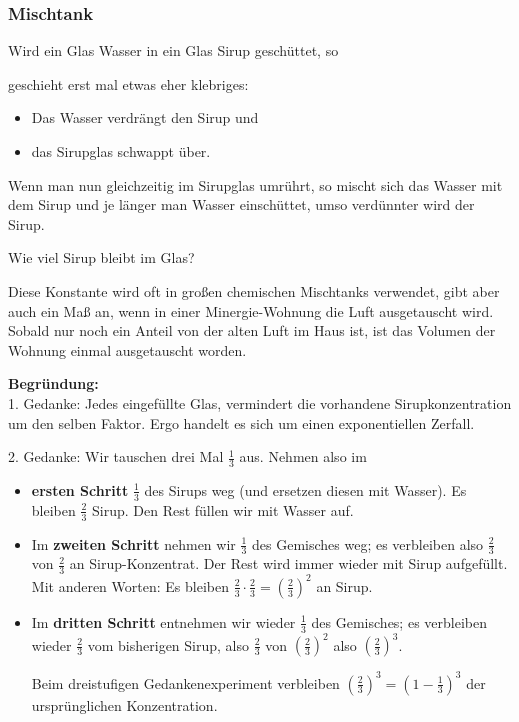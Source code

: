 \subsubsection{Mischtank}\label{sirup_beispiel}
Wird ein Glas Wasser in ein Glas Sirup geschüttet, so


geschieht erst mal etwas eher klebriges:
\begin{itemize}
  \item Das Wasser verdrängt den Sirup und
  \item das Sirupglas schwappt über.
\end{itemize}

Wenn man nun gleichzeitig im Sirupglas
umrührt, so mischt sich das Wasser mit dem Sirup und je länger man
Wasser einschüttet, umso verdünnter wird der Sirup.


Wie viel Sirup bleibt im Glas?


Diese Konstante wird oft in großen chemischen Mischtanks verwendet,
gibt aber auch ein Maß an, wenn \zB in einer Minergie-Wohnung die Luft
ausgetauscht wird. Sobald nur noch ein Anteil von  der alten Luft im
Haus ist, ist das Volumen der Wohnung einmal ausgetauscht worden.
\newpage


\textbf{Begründung:}\\
1. Gedanke: Jedes eingefüllte Glas, vermindert die vorhandene
Sirupkonzentration um den selben Faktor. Ergo handelt es sich um
einen exponentiellen Zerfall.

\leserluft

2. Gedanke: Wir tauschen drei Mal $\frac13$ aus. Nehmen also im
\begin{itemize}
\item \textbf{ersten Schritt} $\frac13$ des Sirups weg (und ersetzen diesen mit Wasser).
  Es bleiben $\frac23$ Sirup. Den Rest füllen wir mit Wasser auf.
\item Im \textbf{zweiten Schritt} nehmen wir $\frac13$ des Gemisches
weg; es verbleiben also $\frac23$ von $\frac23$ an
Sirup-Konzentrat. Der Rest wird immer wieder mit Sirup aufgefüllt. Mit
anderen Worten: Es bleiben $\frac23 \cdot \frac23
= \left(\frac23\right)^2$ an Sirup.
\item Im \textbf{dritten Schritt} entnehmen wir wieder $\frac13$ des
Gemisches; es verbleiben wieder $\frac23$ vom bisherigen Sirup, also
$\frac23$ von $(\frac23)^2$ also $\left(\frac23\right)^3$.

Beim dreistufigen Gedankenexperiment verbleiben
$\left(\frac23\right)^3 = \left(1-\frac13\right)^3$ der ursprünglichen Konzentration.
\end{itemize}
\leserluft

